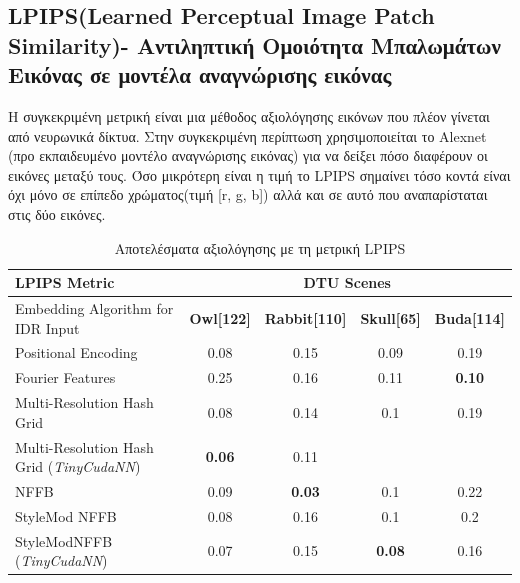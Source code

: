 \subsection{LPIPS(Learned Perceptual Image Patch Similarity)-  Αντιληπτική Ομοιότητα Μπαλωμάτων Εικόνας σε  μοντέλα αναγνώρισης εικόνας}
Η συγκεκριμένη μετρική είναι μια μέθοδος αξιολόγησης εικόνων που πλέον γίνεται από νευρωνικά δίκτυα. Στην συγκεκριμένη περίπτωση χρησιμοποιείται το Alexnet (προ εκπαιδευμένο μοντέλο αναγνώρισης εικόνας) για να δείξει πόσο διαφέρουν οι εικόνες μεταξύ τους. Όσο μικρότερη είναι η τιμή το LPIPS σημαίνει τόσο κοντά είναι όχι μόνο σε επίπεδο χρώματος(τιμή [r, g, b]) αλλά και σε αυτό που αναπαρίσταται στις δύο εικόνες.
\begin{table}[H]
\centering
\begin{tabular}{|l|c|c|c|c|}
\hline
\textbf{LPIPS Metric} & \multicolumn{4}{c|}{\textbf{DTU Scenes}} \\
\hline
Embedding Algorithm for IDR Input & \textbf{Owl[122]} & \textbf{Rabbit[110]} & \textbf{Skull[65]} & \textbf{Buda[114]} \\
\hline
Positional Encoding & 0.08 & 0.15 & 0.09 & 0.19 \\
\hline
Fourier Features & 0.25 & 0.16 & 0.11 & \textbf{0.10} \\
\hline
Multi-Resolution Hash Grid & 0.08 & 0.14 & 0.1 & 0.19 \\
\hline
Multi-Resolution Hash Grid (\textit{TinyCudaNN}) & \textbf{0.06} & 0.11 & & \\
\hline
NFFB & 0.09 & \textbf{0.03 }& 0.1 & 0.22 \\
\hline
StyleMod NFFB & 0.08 & 0.16 & 0.1 & 0.2 \\
\hline
StyleModNFFB (\textit{TinyCudaNN}) & 0.07 & 0.15 & \textbf{0.08} & 0.16 \\
\hline
\end{tabular}
\caption{Αποτελέσματα αξιολόγησης με τη μετρική LPIPS}
\end{table}

